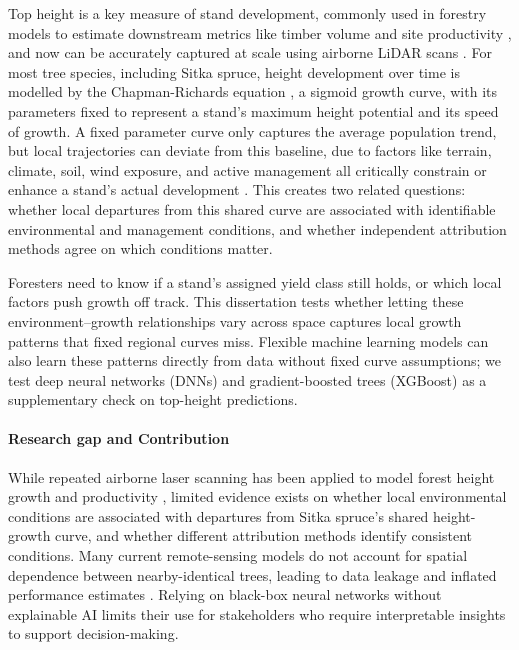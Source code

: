 Top height is a key measure of stand development, commonly used in forestry models to estimate downstream metrics like timber volume and site productivity \cite{ForestResearch2026Sitka_C1_SS}, and now can be accurately captured at scale using airborne LiDAR scans \cite{suarezminguez2008Practical_C1_SS}. For most tree species, including Sitka spruce, height development over time is modelled by the Chapman-Richards equation \cite{pommerening2015Methods_C2_CR}, a sigmoid growth curve, with its parameters fixed to represent a stand's maximum height potential and its speed of growth. A fixed parameter curve only captures the average population trend, but local trajectories can deviate from this baseline, due to factors like terrain, climate, soil, wind exposure, and active management all critically constrain or enhance a stand's actual development \cite{socha2023Higher_C1_SS, cameron2015Building_C1_SS}. This creates two related questions: whether local departures from this shared curve are associated with identifiable environmental and management conditions, and whether independent attribution methods agree on which conditions matter.

Foresters need to know if a stand's assigned yield class still holds, or which local factors push growth off track. This dissertation tests whether letting these environment--growth relationships vary across space captures local growth patterns that fixed regional curves miss. Flexible machine learning models can also learn these patterns directly from data without fixed curve assumptions; we test deep neural networks (DNNs) and gradient-boosted trees (XGBoost) as a supplementary check on top-height predictions.

\paragraph*{Research gap and Contribution}
While repeated airborne laser scanning has been applied to model forest height growth and productivity \cite{janiec2023Development_C1_SS}, limited evidence exists on whether local environmental conditions are associated with departures from Sitka spruce's shared height-growth curve, and whether different attribution methods identify consistent conditions. Many current remote-sensing models do not account for spatial dependence between nearby-identical trees, leading to data leakage and inflated performance estimates \cite{Karasiak2022Spatial_C5_EVAL, ploton2020Spatial_C5_EVAL, lynch2025Digital_C4_NN}. Relying on black-box neural networks without explainable AI limits their use for stakeholders who require interpretable insights to support decision-making.

